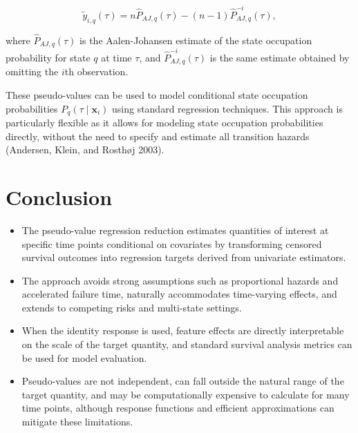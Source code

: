 \documentclass[
  letterpaper,
  krantz2]{style/krantz}
\providecommand{\tightlist}{%
  \setlength{\itemsep}{0pt}\setlength{\parskip}{0pt}}
\begin{document}
\[
\tilde{y}_{i,q}(\tau) = n\hat{P}_{AJ,q}(\tau) - (n-1)\hat{P}_{AJ,q}^{-i}(\tau),
\]

where \(\hat{P}_{AJ,q}(\tau)\) is the Aalen-Johansen estimate of the
state occupation probability for state \(q\) at time \(\tau\), and
\(\hat{P}_{AJ,q}^{-i}(\tau)\) is the same estimate obtained by omitting
the \(i\)th observation.

These pseudo-values can be used to model conditional state occupation
probabilities \(P_q(\tau \mid \mathbf{x}_i)\) using standard regression
techniques. This approach is particularly flexible as it allows for
modeling state occupation probabilities directly, without the need to
specify and estimate all transition hazards (Andersen, Klein, and
Rosthøj 2003).

\section{Conclusion}\label{conclusion-14}

\begin{tcolorbox}[enhanced jigsaw, toprule=.15mm, bottomtitle=1mm, opacityback=0, breakable, leftrule=.75mm, title={Key takeaways}, toptitle=1mm, bottomrule=.15mm, colback=white, colframe=quarto-callout-warning-color-frame, titlerule=0mm, opacitybacktitle=0.6, coltitle=black, rightrule=.15mm, left=2mm, colbacktitle=quarto-callout-warning-color!10!white, arc=.35mm]

\begin{itemize}
\tightlist
\item
  The pseudo-value regression reduction estimates quantities of interest
  at specific time points conditional on covariates by transforming
  censored survival outcomes into regression targets derived from
  univariate estimators.
\item
  The approach avoids strong assumptions such as proportional hazards
  and accelerated failure time, naturally accommodates time-varying
  effects, and extends to competing risks and multi-state settings.
\item
  When the identity response is used, feature effects are directly
  interpretable on the scale of the target quantity, and standard
  survival analysis metrics can be used for model evaluation.
\item
  Pseudo-values are not independent, can fall outside the natural range
  of the target quantity, and may be computationally expensive to
  calculate for many time points, although response functions and
  efficient approximations can mitigate these limitations.
\end{itemize}

\end{tcolorbox}
\end{document}
